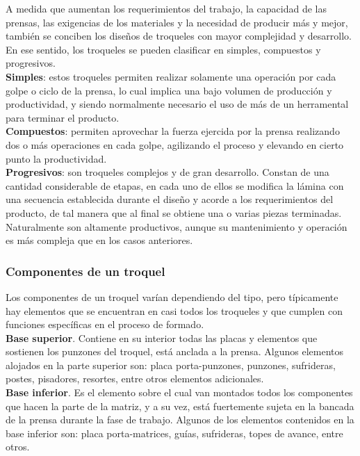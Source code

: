 A medida que aumentan los requerimientos del trabajo, la capacidad de las prensas, las exigencias 
de los materiales y la necesidad de producir más y mejor, también se conciben los diseños de 
troqueles con mayor complejidad y desarrollo. En ese sentido, los troqueles se pueden clasificar 
en simples, compuestos y progresivos.\\

\textbf{Simples}: estos troqueles permiten realizar solamente una operación por cada golpe o 
ciclo de la prensa, lo cual implica una bajo volumen de producción y productividad, y 
siendo normalmente necesario el uso de más de un herramental para terminar el producto.\\

\textbf{Compuestos}: permiten aprovechar la fuerza ejercida por la prensa realizando dos 
o más operaciones en cada golpe, agilizando el proceso y elevando en cierto punto 
la productividad.\\

\textbf{Progresivos}: son troqueles complejos y de gran desarrollo. Constan de una 
cantidad considerable de etapas, en cada uno de ellos se modifica la lámina con una secuencia 
establecida durante el diseño y acorde a los requerimientos del producto, de tal manera 
que al final se obtiene una o varias piezas terminadas. Naturalmente son altamente productivos, 
aunque su mantenimiento y operación es más compleja que en los casos anteriores.

\subsubsection{Componentes de un troquel}

Los componentes de un troquel varían dependiendo del tipo, pero típicamente hay elementos 
que se encuentran en casi todos los troqueles y que cumplen con funciones específicas 
en el proceso de formado.\\

\textbf{Base superior}. Contiene en su interior todas las placas y elementos que sostienen 
los punzones del troquel, está anclada a la prensa. Algunos elementos alojados en 
la parte superior son: placa porta-punzones, punzones, sufrideras, postes, pisadores, resortes, 
entre otros elementos adicionales.\\

\textbf{Base inferior}. Es el elemento sobre el cual van montados todos los componentes 
que hacen la parte de la matriz, y a su vez, está fuertemente sujeta en la bancada 
de la prensa durante la fase de trabajo. Algunos de los elementos contenidos en 
la base inferior son: placa  porta-matrices, guías, sufrideras, topes de avance, entre 
otros.\\

